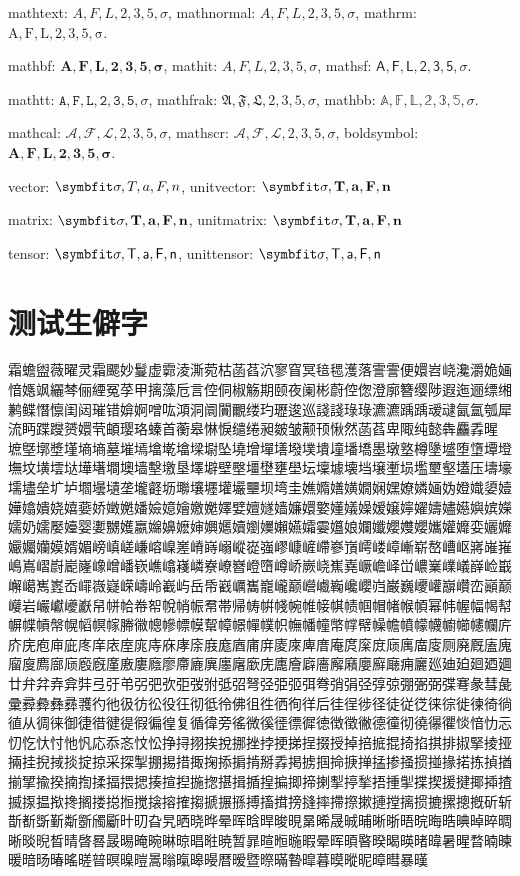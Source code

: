 mathtext: $A,F,L,2,3,5,\sigma$, mathnormal: $A,F,L,2,3,5,\sigma$, mathrm: $\mathrm{A,F,L,2,3,5,\sigma}$.

mathbf: $\mathbf{A,F,L,2,3,5,\sigma}$, mathit: $\mathit{A,F,L,2,3,5,\sigma}$, mathsf: $\mathsf{A,F,L,2,3,5,\sigma}$.

mathtt: $\mathtt{A,F,L,2,3,5,\sigma}$, mathfrak: $\mathfrak{A,F,L,2,3,5,\sigma}$, mathbb: $\mathbb{A,F,L,2,3,5,\sigma}$.

mathcal: $\mathcal{A,F,L,2,3,5,\sigma}$, mathscr: $\mathscr{A,F,L,2,3,5,\sigma}$, boldsymbol: $\boldsymbol{A,F,L,2,3,5,\sigma}$.

vector: $\Vector{\sigma, T, a, F, n}$, unitvector: $\unitVector{\sigma, T, a, F, n}$

matrix: $\Matrix{\sigma, T, a, F, n}$, unitmatrix: $\unitMatrix{\sigma, T, a, F, n}$

tensor: $\Tensor{\sigma, T, a, F, n}$, unittensor: $\unitTensor{\sigma, T, a, F, n}$ 

\section{测试生僻字}

霜蟾盥薇曜灵霜颸妙鬘虚霩淩澌菀枯菡萏泬寥窅冥毰毸濩落霅霅便嬛岧峣瀺灂姽婳愔嫕飒纚棽俪緸冤莩甲摛藻卮言倥侗椒觞期颐夜阑彬蔚倥偬澄廓簪缨陟遐迤逦缥缃鹣鲽憯懔闺闼璀错媕婀噌吰澒洞阛闠覼缕玓瓑逡巡諓諓琭琭瀌瀌踽踽叆叇氤氲瓠犀流眄蹀躞赟嬛茕頔璎珞螓首蘅皋惏悷缱绻昶皴皱颟顸愀然菡萏卑陬纯懿犇麤掱暒 墌墍墎墏墐墒墒墓墔墕墖墘墖墚墛坠墝增墠墡墢墣墤墥墦墧墨墩墪樽墬墭堕墯墰墱墲坟墴墵垯墷墸墹墺墙墼墽垦墿壀壁壂壃壄壅壆坛壈壉壊垱壌壍埙壏壐壑壒压壔壕壖壗垒圹垆壛壜壝垄壠壡坜壣壤壥壦壧壨坝塆圭嫶嫷嫸嫹嫺娴嫼嫽嫾婳妫嬁嬂嬃嬄嬅嬆嬇娆嬉嬊娇嬍嬎嬏嬐嬑嬒嬓嬔嬕嬖嬗嬘嫱嬚嬛嬜嬞嬟嬠嫒嬢嬣嬥嬦嬧嬨嬩嫔嬫嬬奶嬬嬮嬯婴嬱嬲嬳嬴嬵嬶嬷婶嬹嬺嬻嬼嬽嬾嬿孀孁孂娘孄孅孆孇孆孈孉孊娈孋孊孍孎孏嫫婿媚嵭嵮嵯嵰嵱嵲嵳嵴嵵嵶嵷嵸嵹嵺嵻嵼嵽嵾嵿嶀嵝嶂嶃崭嶅嶆岖嶈嶉嶊嶋嶌嶍嶎嶏嶐嶑嶒嶓嵚嶕嶖嶘嶙嶚嶛嶜嶝嶞嶟峤嶡峣嶣嶤嶥嶦峄峃嶩嶪嶫嶬嶭崄嶯嶰嶱嶲嶳岙嶵嶶嶷嵘嶹岭嶻屿岳帋巀巁巂巃巄巅巆巇巈巉巊岿巌巍巎巏巐巑峦巓巅巕岩巗巘巙巚帠帡帢帣帤帨帩帪帬帯帰帱帲帴帵帷帹帺帻帼帽帾帿幁幂帏幄幅幆幇幈幉幊幋幌幍幎幏幐幑幒幓幖幙幚幛幜幝幞帜幠幡幢幤幥幦幧幨幩幪幭幮幯幰幱庍庎庑庖庘庛庝庠庡庢庣庤庥庨庩庪庬庮庯庰庱庲庳庴庵庹庺庻庼庽庿廀厕廃厩廅廆廇廋廌廍庼廏廐廑廒廔廕廖廗廘廙廛廜廞庑廤廥廦廧廨廭廮廯廰痈廲廵廸廹廻廼廽廿弁弅弆弇弉弖弙弚弜弝弞弡弢弣弤弨弩弪弫弬弭弮弰弲弪弴弶弸弻弼弽弿彖彗彘彚彛彜彝彞彟彴彵彶彷彸役彺彻彽彾佛徂徃徆徇徉后徍徎徏径徒従徔徕徖徙徚徛徜徝从徟徕御徢徣徤徥徦徧徨复循徫旁徭微徯徰徱徲徳徴徵徶德徸彻徺忁忂惔愔忇忈忉忔忕忖忚忛応忝忞忟忪挣挦挧挨挩挪挫挬挭挮挰掇授掉掊掋掍掎掐掑排掓掔掕挜掚挂掜掝掞掟掠采探掣掤掦措掫掬掭掮掯掰掱掲掳掴掵掶掸掹掺掻掼掽掾掿拣揁揂揃揅揄揆揇揈揉揊揋揌揍揎揑揓揔揕揖揗揘揙揤揥揦揧揨揫捂揰揱揲揳援揵揶揷揸揻揼揾揿搀搁搂搃搄搅搇搈搉搊搋搌搎搏搐搑搒摓摔摕摖摗摙摚摛掼摝摞摠摡斫斩斮斱斲斳斴斵斶斸旪旫旮旯晒晓晔晕晖晗晘晙晛晜晞晟晠晡晰晣晤晥晦晧晪晫晬晭晰晱晲晳晴晵晷晸晹晻晼晽晾晿暀暁暂暃暄暅暆暇晕晖暊暋暌暍暎暏暐暑暒暓暔暕暖暗旸暙暚暛暜暝暞暟暠暡暣暤暥暦暧暨暩暪暬暭暮暯暰昵暲暳暴暵
